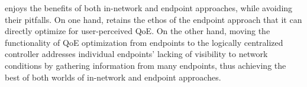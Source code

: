 \ddn enjoys the benefits of both in-network and endpoint approaches, while avoiding
their pitfalls.
On one hand, \ddn retains the ethos of the endpoint approach that it can directly optimize
for user-perceived QoE.
On the other hand, moving the functionality of QoE optimization from endpoints to 
the logically centralized controller addresses individual endpoints' lacking of visibility to network 
conditions by gathering information from many endpoints, thus achieving 
the best of both worlds of in-network and endpoint approaches.


